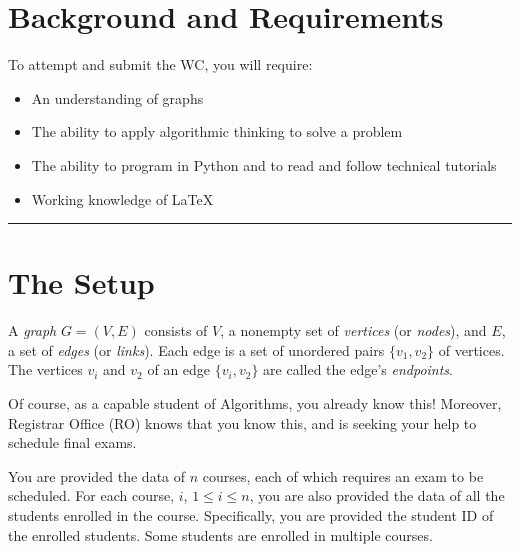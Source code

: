 \documentclass[a4paper]{exam}
\begin{document}
\section*{Background and Requirements}

To attempt and submit the WC, you will require:
\begin{itemize}
\item An understanding of graphs
\item The ability to apply algorithmic thinking to solve a problem
\item The ability to program in Python and to read and follow technical tutorials
\item Working knowledge of \LaTeX
\end{itemize}

\begin{center}
  \rule{300pt}{1pt}
  
\end{center}
\newpage
\section*{The Setup}

A \textit{graph} $G= (V, E)$ consists of $V$, a nonempty set of \textit{vertices} (or \textit{nodes}), and $E$, a set of \textit{edges} (or \textit{links}). Each edge is a set of unordered pairs $\{v_1, v_2\}$ of vertices. The vertices $v_i$ and $v_2$ of an edge $\{v_i, v_2\}$ are called the edge's \textit{endpoints}. 

Of course, as a capable student of Algorithms, you already know this! Moreover, Registrar Office (RO) knows that you know this, and is seeking your help to schedule final exams.

You are provided the data of $n$ courses, each of which requires an exam to be scheduled. For each course, $i$, $1\le i \le n$, you are also provided the data of all the students enrolled in the course. Specifically, you are provided the student ID of the enrolled students. Some students are enrolled in multiple courses.
\end{document}
